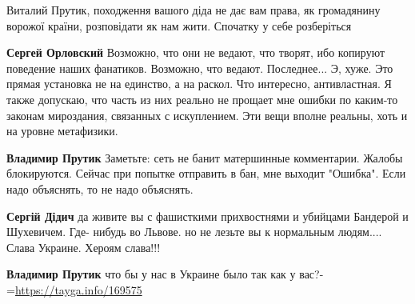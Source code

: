 \begin{itemize}
\begin{itemize}
Виталий Прутик, походження вашого діда не дає вам права, як громадянину ворожої країни, розповідати як нам жити. Спочатку у себе розберіться

 
\textbf{Сергей Орловский} Возможно, что они не ведают, что творят, ибо копируют
поведение наших фанатиков. Возможно, что ведают. Последнее... Э, хуже. Это
прямая установка не на единство, а на раскол. Что интересно, антивластная. Я
также допускаю, что часть из них реально не прощает мне ошибки по каким-то
законам мироздания, связанных с искуплением. Эти вещи вполне реальны, хоть и на
уровне метафизики.

 
\textbf{Владимир Прутик} Заметьте: сеть не банит матершинные комментарии. Жалобы блокируются. Сейчас при попытке отправить в бан, мне выходит "Ошибка". Если надо объяснять, то не надо объяснять.

 
\textbf{Сергій Дідич} да живите вы с фашисткими прихвостнями и убийцами
Бандерой и Шухевичем. Где- нибудь во Львове. но не лезьте вы к нормальным
людям.... Слава Украине. Хероям слава!!!

 
\textbf{Владимир Прутик} что бы у нас в Украине было так как у вас?-=\url{https://tayga.info/169575}

 

\end{itemize}
\end{itemize}
